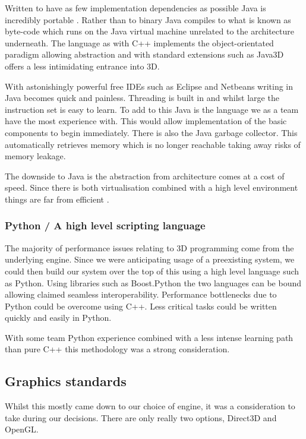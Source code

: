Written to have as few implementation dependencies as possible Java
is incredibly portable \cite{AboutJava}. Rather than to binary Java
compiles to what is known as byte-code which runs on the Java virtual
machine unrelated to the architecture underneath. The language as
with C++ implements the object-orientated paradigm allowing abstraction
and with standard extensions such as Java3D offers a less intimidating
entrance into 3D.

With astonishingly powerful free IDEs such as Eclipse and Netbeans
writing in Java becomes quick and painless. Threading is built in
and whilst large the instruction set is easy to learn. To add to this
Java is the language we as a team have the most experience with. This
would allow implementation of the basic components to begin immediately.
There is also the Java garbage collector. This automatically retrieves
memory which is no longer reachable taking away risks of memory leakage.

The downside to Java is the abstraction from architecture comes at
a cost of speed. Since there is both virtualisation combined with
a high level environment things are far from efficient \cite{Jelovic}. 


\subsubsection{Python / A high level scripting language}

The majority of performance issues relating to 3D programming come
from the underlying engine. Since we were anticipating usage of a
preexisting system, we could then build our system over the top of
this using a high level language such as Python. Using libraries such
as Boost.Python \cite{boostPython} the two languages can be bound
allowing claimed seamless interoperability. Performance bottlenecks
due to Python could be overcome using C++. Less critical tasks could
be written quickly and easily in Python.

With some team Python experience combined with a less intense learning
path than pure C++ this methodology was a strong consideration.


\subsection{Graphics standards}

Whilst this mostly came down to our choice of engine, it was a consideration
to take during our decisions. There are only really two options, Direct3D
and OpenGL.


